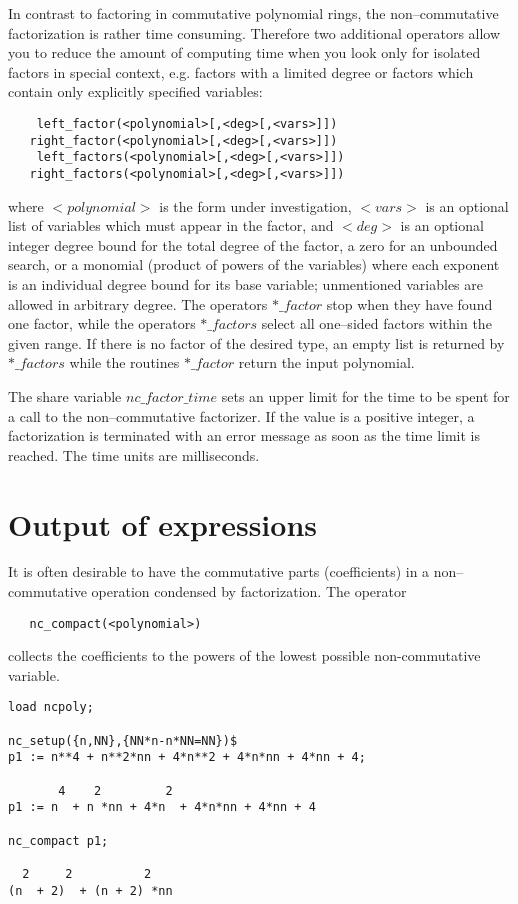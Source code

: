 In contrast to factoring in commutative polynomial rings, the non--commutative
factorization is rather time consuming. Therefore two additional
operators allow you to reduce the amount of computing time when
you look only for isolated factors in special context, e.g. factors
with a limited degree or factors which contain only explicitly
specified variables:
\begin{verbatim}
    left_factor(<polynomial>[,<deg>[,<vars>]])
   right_factor(<polynomial>[,<deg>[,<vars>]])
    left_factors(<polynomial>[,<deg>[,<vars>]])
   right_factors(<polynomial>[,<deg>[,<vars>]])
\end{verbatim}
where $<polynomial>$ is the form under investigation,
$<vars>$ is an optional list of variables which must appear in the
factor, and $<deg>$
is an optional integer degree bound for the total degree of the
factor, a zero for an unbounded search, or a monomial
(product of powers of the variables) where each exponent
is an individual degree bound for its base variable; unmentioned
variables are allowed in arbitrary degree. The operators
$*\_factor$ stop when they have found one factor, while
the operators $*\_factors$ select all one--sided factors
within the given range. If there is no factor of the
desired type, an empty list is returned by $*\_factors$
while the routines $*\_factor$ return the input polynomial.


The share variable $nc\_factor\_time$ sets an upper limit
for the time to be spent for a call to the non--commutative
factorizer. If the value is a positive integer, a
factorization is terminated with an error message as soon
as the time limit is reached. The time units are milliseconds.

\section{Output of expressions}

It is often desirable to have the commutative parts (coefficients)
in a non--commutative operation condensed by factorization. The operator
\begin{verbatim}
   nc_compact(<polynomial>)
\end{verbatim}
collects the coefficients to the powers of the lowest possible
non-commutative variable.
\begin{verbatim}
load ncpoly;

nc_setup({n,NN},{NN*n-n*NN=NN})$
p1 := n**4 + n**2*nn + 4*n**2 + 4*n*nn + 4*nn + 4;

       4    2         2
p1 := n  + n *nn + 4*n  + 4*n*nn + 4*nn + 4

nc_compact p1;

  2     2          2
(n  + 2)  + (n + 2) *nn
\end{verbatim}


